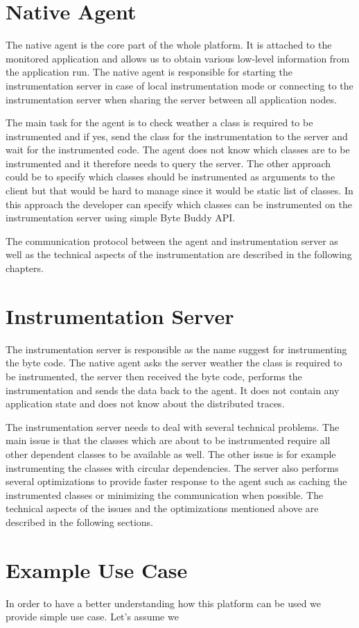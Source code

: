 \section{Native Agent}
The native agent is the core part of the whole platform. It is attached to the monitored application and allows us to obtain various low-level information from the application run. The native agent is responsible for starting the instrumentation server in case of local instrumentation mode or connecting to the instrumentation server when sharing the server between all application nodes.

The main task for the agent is to check weather a class is required to be instrumented and if yes, send the class for the instrumentation to the server and wait for the instrumented code. The agent does not know which classes are to be instrumented and it therefore needs to query the server. The other approach could be to specify which classes should be instrumented as arguments to the client but that would be hard to manage since it would be static list of classes. In this approach the developer can specify which classes can be instrumented on the instrumentation server using simple Byte Buddy API.

The communication protocol between the agent and instrumentation server as well as the technical aspects of the instrumentation are described in the following chapters.
\section{Instrumentation Server}
The instrumentation server is responsible as the name suggest for instrumenting the byte code. The native agent asks the server weather the class is required to be instrumented, the server then received the byte code, performs the instrumentation and sends the data back to the agent. It does not contain any application state and does not know about the distributed traces.

The instrumentation server needs to deal with several technical problems. The main issue is that the classes which are about to be instrumented require all other dependent classes to be available as well. The other issue is for example instrumenting the classes with circular dependencies. The server also performs several optimizations to provide faster response to the agent such as caching the instrumented classes or minimizing the communication when possible. The technical aspects of the issues and the optimizations mentioned above are described in the following sections.
\section{Example Use Case}
In order to have a better understanding how this platform can be used we provide simple use case. Let's assume we 